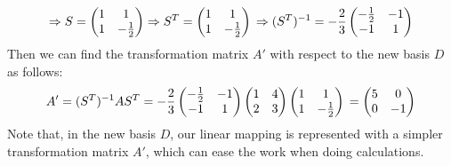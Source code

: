 \begin{example}
$$\Rightarrow S = \begin{pmatrix}
1 & 1\\
1 & -\frac{1}{2}
\end{pmatrix} \Rightarrow S^T =\begin{pmatrix}
1 & 1\\
1 & -\frac{1}{2}
\end{pmatrix}\\
\Rightarrow (S^T)^{-1} = -\frac{2}{3}\begin{pmatrix}
-\frac{1}{2} & -1\\
-1 & 1
\end{pmatrix}
$$
Then we can find the transformation matrix $A'$ with respect to the new basis $D$ as follows:
$$
A' =  (S^T)^{-1} A S^T = -\frac{2}{3}\begin{pmatrix}
-\frac{1}{2} & -1\\
-1 & 1
\end{pmatrix}\begin{pmatrix}
1 & 4\\
2 & 3
\end{pmatrix}\begin{pmatrix}
1 & 1\\
1 & -\frac{1}{2}
\end{pmatrix}\\
= \begin{pmatrix}
5 & 0\\
0 & -1
\end{pmatrix}
$$
Note that, in the new basis $D$, our linear mapping is represented with a simpler transformation matrix $A'$, which can ease the work when doing calculations.
\end{example}